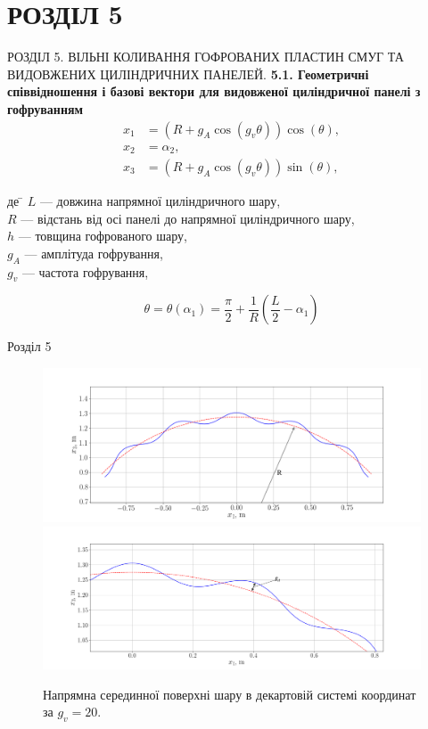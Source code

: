 \documentclass[8pt]{beamer}
\numberwithin{figure}{section}
\numberwithin{equation}{section}
\numberwithin{table}{section}
\begin{document}
\section{РОЗДІЛ 5}

\begin{frame}{РОЗДІЛ 5. ВІЛЬНІ КОЛИВАННЯ ГОФРОВАНИХ ПЛАСТИН СМУГ ТА ВИДОВЖЕНИХ ЦИЛІНДРИЧНИХ ПАНЕЛЕЙ.}
\textbf{5.1. Геометричні співвідношення і базові вектори для видовженої циліндричної панелі з гофруванням}
\\
\vspace{1em}
\begin{align}
x_1&=\left(R + g_{A}\cos\left(g_v\theta\right) \right)\cos\left(\theta\right), \\
x_2&=\alpha_2,\\
x_3&=\left(R + g_{A}\cos\left(g_v\theta\right) \right)\sin\left(\theta\right), 
\end{align}

\begin{tabbing}
де \= $L$ --- довжина напрямної циліндричного шару,\\
\> $R$ --- відстань від осі панелі до напрямної циліндричного шару,\\
\> $h$ --- товщина гофрованого шару,\\
\> $g_A$ --- амплітуда гофрування,\\
\> $g_v$ --- частота гофрування,\\
\end{tabbing}
\[
\theta=\theta\left(\alpha_1\right)=\frac{\pi}{2}+\frac{1}{R}\left(\frac{L}{2}-\alpha_1\right)\]


\end{frame}

\begin{frame}{Розділ 5}

\begin{figure}
	\includegraphics[width=0.8\linewidth]{pic/cor_geomR.png}\\
	\includegraphics[width=0.8\linewidth]{pic/cor_geom_zoomedR.png}
		\caption{Напрямна серединної поверхні шару в декартовій системі координат за $g_v=20$.}
		\label{fig:omage_K_h}
\end{figure}



\end{frame}
\end{document}
